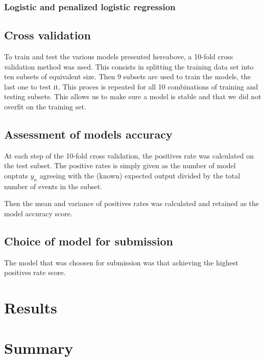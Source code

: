 \documentclass[10pt,conference,compsocconf]{IEEEtran}
\begin{document}
\subsubsection{Logistic and penalized logistic regression}

\subsection{Cross validation}

To train and test the various models presented hereabove, a 10-fold cross validation method was used. This consists in splitting the training data set into ten subsets of equivalent size. Then 9 subsets are used to train the models, the last one to test it. This proces is repeated for all 10 combinations of training and testing subsets. This allows us to make sure a model is stable and that we did not overfit on the training set.

\subsection{Assessment of models accuracy}

At each step of the 10-fold cross validation, the positives rate was calculated on the test subset. The positive rates is simply given as the number of model ouptuts $y_n$ agreeing with the (known) expected output divided by the total number of events in the subset.

Then the mean and variance of positives rates was calculated and retained as the model accuracy score.

\subsection{Choice of model for submission}

The model that was choosen for submission was that achieving the highest positives rate score.

\section{Results}



\section{Summary}
\end{document}
